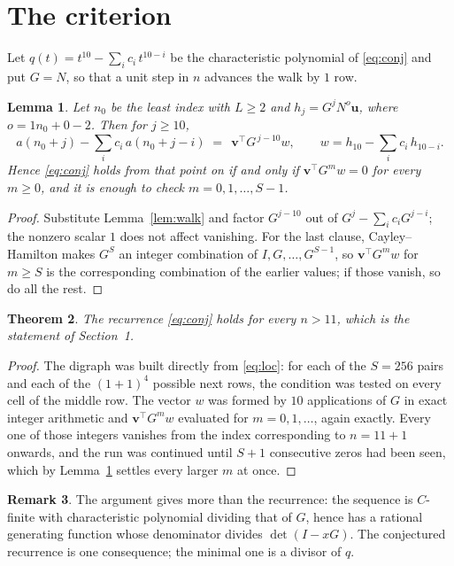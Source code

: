 \documentclass[11pt,a4paper]{article}
\theoremstyle{plain}
\newtheorem{theorem}{Theorem}
\newtheorem{lemma}[theorem]{Lemma}
\theoremstyle{definition}
\newtheorem{remark}[theorem]{Remark}
\begin{document}
\section{The criterion}

Let $q(t)=t^{10}-\sum_i c_i\,t^{10-i}$ be the characteristic polynomial of
\eqref{eq:conj} and put $G=N$, so that a unit step in $n$ advances the walk by
$1$ row.

\begin{lemma}\label{lem:crit}
Let $n_0$ be the least index with $L\ge2$ and $h_j=G^{j}N^{o}\mathbf{u}$, where
$o=1n_0+0-2$. Then for $j\ge10$,
\[
a(n_0+j)-\sum_i c_i\,a(n_0+j-i)\;=\;\,\mathbf{v}^{\!\top}G^{\,j-10}w,
\qquad w=h_{10}-\sum_i c_i\,h_{10-i} .
\]
Hence \eqref{eq:conj} holds from that point on if and only if
$\mathbf{v}^{\!\top}G^{m}w=0$ for every $m\ge0$, and it is enough to check
$m=0,1,\dots,S-1$.
\end{lemma}

\begin{proof}
Substitute Lemma~\ref{lem:walk} and factor $G^{j-10}$ out of
$G^{j}-\sum_ic_iG^{j-i}$; the nonzero scalar $1$ does not affect
vanishing. For the last clause, Cayley--Hamilton makes $G^{S}$ an integer combination of
$I,G,\dots,G^{S-1}$, so $\mathbf{v}^{\!\top}G^{m}w$ for $m\ge S$ is the corresponding
combination of the earlier values; if those vanish, so do all the rest.
\end{proof}

\begin{theorem}
The recurrence \eqref{eq:conj} holds for every $n>11$, which is the statement of
Section~1.
\end{theorem}

\begin{proof}
The digraph was built directly from \eqref{eq:loc}: for each of the $S=256$ pairs and each
of the $(1+1)^{4}$ possible next rows, the condition was tested on every cell of
the middle row. The vector $w$ was formed by $10$ applications of $G$ in exact integer
arithmetic and $\mathbf{v}^{\!\top}G^{m}w$ evaluated for $m=0,1,\dots$, again exactly.
Every one of those integers vanishes from the index corresponding to $n=11+1$ onwards,
and the run was continued until $S+1$ consecutive zeros had been seen, which by
Lemma~\ref{lem:crit} settles every larger $m$ at once.
\end{proof}

\begin{remark}
The argument gives more than the recurrence: the sequence is $C$-finite with characteristic
polynomial dividing that of $G$, hence has a rational generating function whose denominator
divides $\det(I-xG)$. The conjectured recurrence is one consequence; the minimal one is a
divisor of $q$.
\end{remark}
\end{document}
